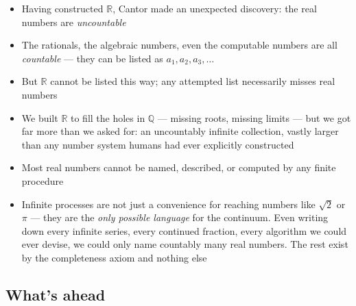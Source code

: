 \documentclass[
  10pt,
  letterpaper,
]{scrbook}
\providecommand{\tightlist}{%
  \setlength{\itemsep}{0pt}\setlength{\parskip}{0pt}}
\newcommand{\QQ}{\mathbb{Q}}
\newcommand{\RR}{\mathbb{R}}
\begin{document}
\begin{itemize}
\tightlist
\item
  Having constructed \(\RR\), Cantor made an unexpected discovery: the
  real numbers are \emph{uncountable}
\item
  The rationals, the algebraic numbers, even the computable numbers are
  all \emph{countable} --- they can be listed as
  \(a_1, a_2, a_3, \ldots\)
\item
  But \(\RR\) cannot be listed this way; any attempted list necessarily
  misses real numbers
\item
  We built \(\RR\) to fill the holes in \(\QQ\) --- missing roots,
  missing limits --- but we got far more than we asked for: an
  uncountably infinite collection, vastly larger than any number system
  humans had ever explicitly constructed
\item
  Most real numbers cannot be named, described, or computed by any
  finite procedure
\item
  Infinite processes are not just a convenience for reaching numbers
  like \(\sqrt{2}\) or \(\pi\) --- they are the \emph{only possible
  language} for the continuum. Even writing down every infinite series,
  every continued fraction, every algorithm we could ever devise, we
  could only name countably many real numbers. The rest exist by the
  completeness axiom and nothing else
\end{itemize}

\subsection*{What's ahead}\label{whats-ahead}
\end{document}
